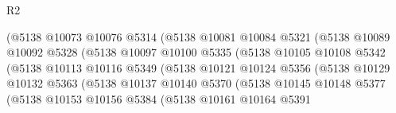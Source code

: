 \begin{lexlean}{R2}
\begin{coremodule}
                                    (@5138
                                      @10073
                                      @10076
                                      @5314
                                      (@5138
                                        @10081
                                        @10084
                                        @5321
                                        (@5138
                                          @10089
                                          @10092
                                          @5328
                                          (@5138
                                            @10097
                                            @10100
                                            @5335
                                            (@5138
                                              @10105
                                              @10108
                                              @5342
                                              (@5138
                                                @10113
                                                @10116
                                                @5349
                                                (@5138
                                                  @10121
                                                  @10124
                                                  @5356
                                                  (@5138
                                                    @10129
                                                    @10132
                                                    @5363
                                                    (@5138
                                                      @10137
                                                      @10140
                                                      @5370
                                                      (@5138
                                                        @10145
                                                        @10148
                                                        @5377
                                                        (@5138
                                                          @10153
                                                          @10156
                                                          @5384
                                                          (@5138
                                                            @10161
                                                            @10164
                                                            @5391

\end{coremodule}
\end{lexlean}

